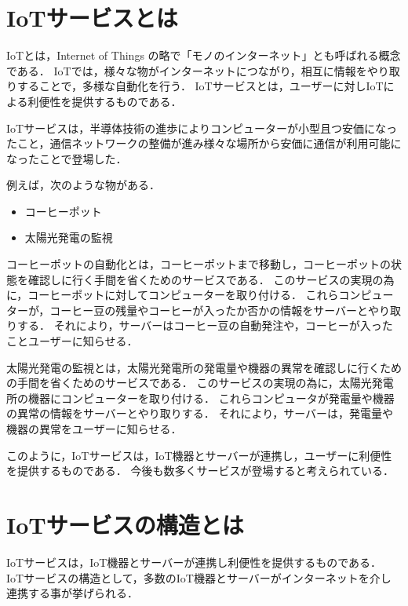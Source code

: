\section{IoTサービスとは}
IoTとは，Internet of Things の略で「モノのインターネット」とも呼ばれる概念である．
IoTでは，様々な物がインターネットにつながり，相互に情報をやり取りすることで，多様な自動化を行う．
IoTサービスとは，ユーザーに対しIoTによる利便性を提供するものである．
\medskip

IoTサービスは，半導体技術の進歩によりコンピューターが小型且つ安価になったこと，通信ネットワークの整備が進み様々な場所から安価に通信が利用可能になったことで登場した．
\medskip

例えば，次のような物がある．
\begin{itemize}
	\item コーヒーポット
	\item 太陽光発電の監視
\end{itemize}

コーヒーポットの自動化とは，コーヒーポットまで移動し，コーヒーポットの状態を確認しに行く手間を省くためのサービスである．
このサービスの実現の為に，コーヒーポットに対してコンピューターを取り付ける．
これらコンピューターが，コーヒー豆の残量やコーヒーが入ったか否かの情報をサーバーとやり取りする．
それにより，サーバーはコーヒー豆の自動発注や，コーヒーが入ったことユーザーに知らせる．
\medskip

太陽光発電の監視とは，太陽光発電所の発電量や機器の異常を確認しに行くための手間を省くためのサービスである．
このサービスの実現の為に，太陽光発電所の機器にコンピューターを取り付ける．
これらコンピュータが発電量や機器の異常の情報をサーバーとやり取りする．
それにより，サーバーは，発電量や機器の異常をユーザーに知らせる．
\medskip

このように，IoTサービスは，IoT機器とサーバーが連携し，ユーザーに利便性を提供するものである．
今後も数多くサービスが登場すると考えられている．

\section{IoTサービスの構造とは}
IoTサービスは，IoT機器とサーバーが連携し利便性を提供するものである．
IoTサービスの構造として，多数のIoT機器とサーバーがインターネットを介し連携する事が挙げられる．
\medskip

